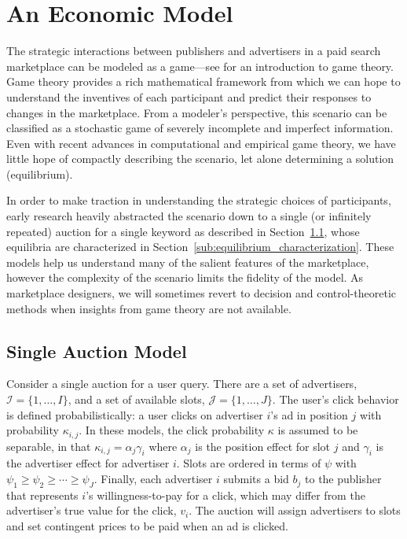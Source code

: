 \documentclass[prodmode,acmtist]{acmsmall} %
\begin{document}

\section{An Economic Model} %
\label{sec:auction_and_marketplace_design}

The strategic interactions between publishers and advertisers in a paid search marketplace can be modeled as a game---see  for an introduction to game theory.
Game theory provides a rich mathematical framework from which we can hope to understand the inventives of each participant and predict their responses to changes in the marketplace.
From a modeler's perspective, this scenario can be classified as a stochastic game of severely incomplete and imperfect information.
Even with recent advances in computational and empirical game theory, we have little hope of compactly describing the scenario, let alone determining a solution (equilibrium).


In order to make traction in understanding the strategic choices of participants, early research heavily abstracted the scenario down to a single (or infinitely repeated) auction for a single keyword as described in Section~\ref{sub:single_auction_model}, whose equilibria are characterized in Section~\ref{sub:equilibrium_characterization}. 
These models help us understand many of the salient features of the marketplace, however the complexity of the scenario limits the fidelity of the model.
As marketplace designers, we will sometimes revert to decision and control-theoretic methods when insights from game theory are not available.


\subsection{Single Auction Model} %
\label{sub:single_auction_model}

Consider a single auction for a user query. 
There are a set of advertisers, $\mathcal{I} = \{1,\ldots,I\}$, and a set of available slots, $\mathcal{J} = \{1, \ldots, J\}$.  
The user's click behavior is defined probabilistically: a user clicks on advertiser $i$'s ad in position $j$ with probability $\kappa_{i,j}$.  
In these models, the click probability $\kappa$ is assumed to be separable, in that $\kappa_{i,j} = \alpha_j\gamma_i$ where $\alpha_j$ is the position effect for slot $j$ and $\gamma_i$ is the advertiser effect for advertiser $i$.  
Slots are ordered in terms of $\psi$ with $\psi_1 \ge \psi_2 \ge \cdots \ge \psi_{J}$.    
Finally, each advertiser $i$ submits a bid $b_j$ to the publisher that represents $i$'s willingness-to-pay for a click, which may differ from the advertiser's true value for the click, $v_i$. 
The auction will assign advertisers to slots and set contingent prices to be paid when an ad is clicked.
\end{document}
